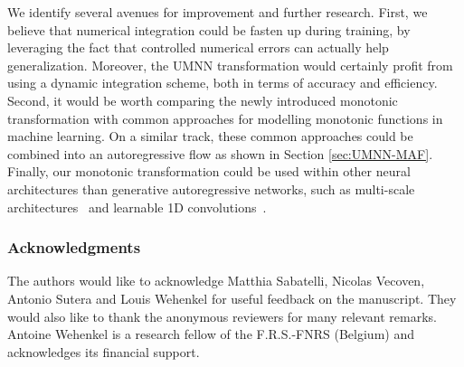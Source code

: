 \documentclass{article}
\begin{document}
We identify several avenues for improvement and further research.
First, we believe that numerical integration could be fasten up during training, by leveraging the fact that controlled numerical errors can actually help generalization. Moreover, the UMNN transformation would certainly profit from using a dynamic integration scheme, both in terms of accuracy and efficiency.
Second, it would be worth comparing the newly introduced monotonic transformation with common approaches for modelling monotonic functions in machine learning. On a similar track, these common approaches could be combined into an autoregressive flow as shown in Section \ref{sec:UMNN-MAF}.
Finally, our monotonic transformation could be used within other neural architectures than generative autoregressive networks, such as multi-scale architectures~\citep{RealNVP} and learnable 1D convolutions~\citep{GLOW}.



\subsubsection*{Acknowledgments}
The authors would like to acknowledge Matthia Sabatelli, Nicolas Vecoven, Antonio Sutera and Louis Wehenkel for useful feedback on the manuscript. They would also like to thank the anonymous reviewers for many relevant remarks. Antoine Wehenkel is a research fellow of the F.R.S.-FNRS (Belgium) and acknowledges its financial support.
\newpage


\newpage

\end{document}
